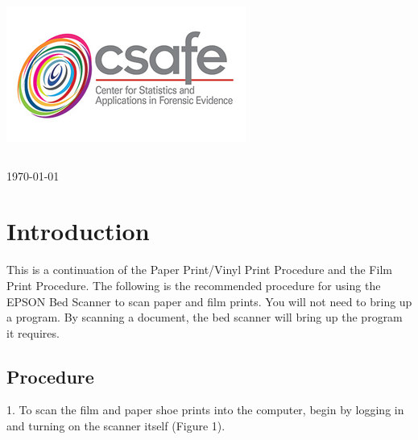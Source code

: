 \begin{titlepage}
\includegraphics[scale=.5]{Logo}\\[1cm]

\begin{center}
\begin{tabular}{ c   |   c } 
 
\end{tabular}
\end{center}

{\large \today}\\[2cm] %


 

\vfill %

\end{titlepage}


\section{Introduction}

This is a continuation of the Paper Print/Vinyl Print Procedure and the Film Print Procedure. The following is the recommended procedure for using the EPSON Bed Scanner to scan paper and film prints. You will not need to bring up a program. By scanning a document, the bed scanner will bring up the program it requires.

\subsection{Procedure}

1. To scan the film and paper shoe prints into the computer, begin by logging in and turning on the scanner itself (Figure 1). 

